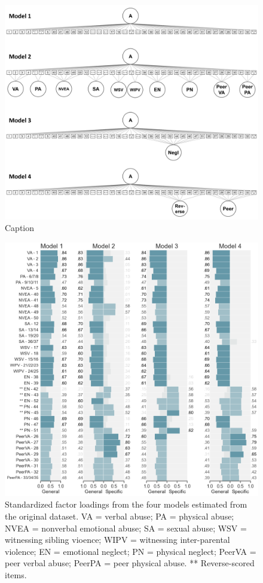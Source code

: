 \documentclass[letterpaper,man,natbib]{apa6}  %
\begin{document}
\begin{figure}
    \centering
    \includegraphics[width=1.1\textwidth,center]{figures/fig00.png}
    \caption{Caption}
    \label{fig:models}
\end{figure}

\begin{figure}
    \centering
    \includegraphics[width=1.1\textwidth,center]{figures/fig01.png}
    \caption{Standardized factor loadings from the four models estimated from the original dataset. VA = verbal abuse; PA = physical abuse; NVEA = nonverbal emotional abuse; SA = sexual abuse; WSV = witnessing sibling vioence; WIPV = witnessing inter-parental violence; EN = emotional neglect; PN = physical neglect; PeerVA = peer verbal abuse; PeerPA = peer physical abuse. ** Reverse-scored items.}
    \label{fig:loadings_original}
\end{figure}
\end{document}
